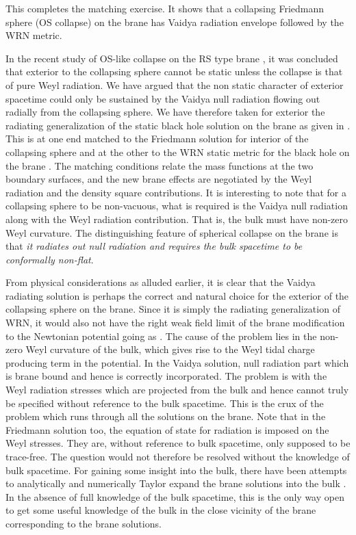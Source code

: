 \documentclass[a4paper,twocolumn,showpacs,preprintnumbers,amsmath,amssymb]{revtex4}
\begin{document}
This completes the matching exercise. It shows that a collapsing Friedmann 
sphere (OS collapse) on the brane has Vaidya radiation envelope followed by 
the WRN metric. 



In the recent study of OS-like collapse on the RS type brane \cite{r}, it
was concluded that exterior to the collapsing sphere cannot be static
unless the collapse is that of pure Weyl radiation. We have argued that the  
non static character of exterior spacetime could only be sustained by 
the Vaidya null radiation flowing out radially from the collapsing sphere. 
We have therefore taken for exterior the radiating generalization of the 
static black hole solution on the brane as given in \cite{n2}. This is at one 
end matched to the Friedmann solution for interior of the collapsing sphere 
and at the other to the WRN static metric for the black hole on the brane 
\cite{r6}. The matching conditions relate the mass functions at the two 
boundary surfaces, and the new brane effects are negotiated by the Weyl 
radiation and the density square contributions. It is interesting to note 
that for a collapsing sphere to be non-vacuous, what is required is the 
Vaidya null radiation along with the Weyl radiation contribution. That is, 
the bulk must have non-zero Weyl curvature. The distinguishing feature of 
spherical collapse on the brane is that 
{\em it radiates out null radiation and requires the bulk spacetime 
to be conformally non-flat}. 

From physical considerations as alluded earlier, it is clear that the Vaidya 
radiating solution is perhaps the correct and natural choice for the exterior 
of the collapsing sphere on the brane. Since it is simply the radiating 
generalization of WRN, it would also not have the right weak field limit of 
the brane modification to the Newtonian potential going as \coordHE{}. The cause
 of the problem lies in the non-zero Weyl curvature of the bulk, which gives 
rise to the Weyl tidal charge producing \coordHE{} term in the potential. In 
the Vaidya solution, null radiation part which is brane bound and hence is 
correctly incorporated. The problem is with the Weyl radiation stresses 
which are projected from the bulk and hence cannot truly be specified without 
reference to the bulk spacetime. This is the crux of the problem which runs 
through all the solutions on the brane. Note that in the Friedmann solution 
too, the equation of state for radiation is imposed on the Weyl stresses. 
They are, without reference to bulk spacetime, only supposed to be trace-free.
 The question would not therefore be resolved without the knowledge of bulk 
spacetime. For gaining some insight into the bulk, there have been 
attempts to analytically and numerically Taylor expand the brane solutions 
into the bulk \cite{n8,n9,rsd}. In the absence of full knowledge of the bulk 
spacetime, this is the only way open to get some useful knowledge of the bulk 
in the close vicinity of the brane corresponding to the brane solutions.  
\end{document}
